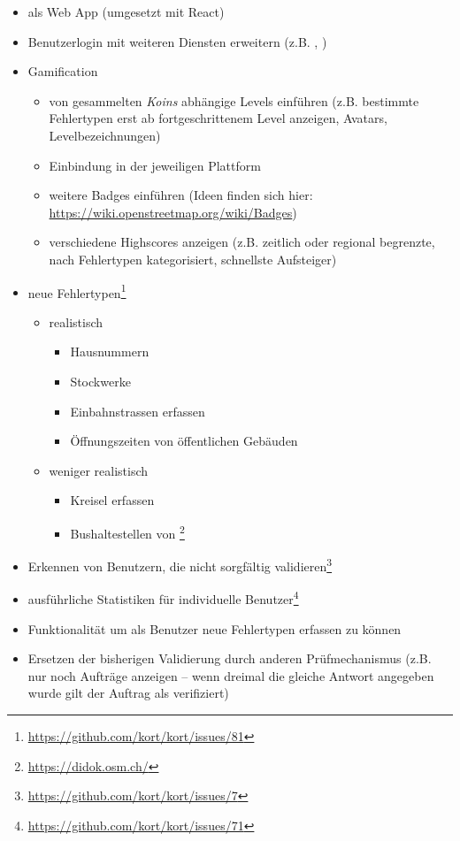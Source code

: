 \begin{itemize}
  \item \kort{} als Web App (umgesetzt mit React)
	\item Benutzerlogin mit weiteren  Diensten erweitern (z.B. , )
	\item \gls{Gamification}
	\begin{itemize}
		\item von gesammelten \emph{Koins} abhängige Levels einführen (z.B. bestimmte Fehlertypen erst ab fortgeschrittenem Level anzeigen, Avatars, Levelbezeichnungen)
		\item Einbindung in  der jeweiligen Plattform
		\item weitere Badges einführen (Ideen finden sich hier: \url{https://wiki.openstreetmap.org/wiki/Badges})
		\item verschiedene Highscores anzeigen (z.B. zeitlich oder regional begrenzte, nach Fehlertypen kategorisiert, schnellste Aufsteiger)
	\end{itemize}
	\item neue Fehlertypen\footnote{\url{https://github.com/kort/kort/issues/81}}
	\begin{itemize}
		\item realistisch
		\begin{itemize}
			\item Hausnummern
			\item Stockwerke
			\item Einbahnstrassen erfassen
			\item Öffnungszeiten von öffentlichen Gebäuden
		\end{itemize}
		\item weniger realistisch
		\begin{itemize}
			\item Kreisel erfassen
			\item Bushaltestellen von \footnote{\url{https://didok.osm.ch/}}
		\end{itemize}
	\end{itemize}
	\item Erkennen von Benutzern, die nicht sorgfältig validieren\footnote{\url{https://github.com/kort/kort/issues/7}}
	\item ausführliche Statistiken für individuelle Benutzer\footnote{\url{https://github.com/kort/kort/issues/71}}
	\item Funktionalität um als Benutzer neue Fehlertypen erfassen zu können
	\item Ersetzen der bisherigen Validierung durch anderen Prüfmechanismus (z.B. nur noch Aufträge anzeigen – wenn dreimal die gleiche Antwort angegeben wurde gilt der Auftrag als verifiziert)

\end{itemize}
